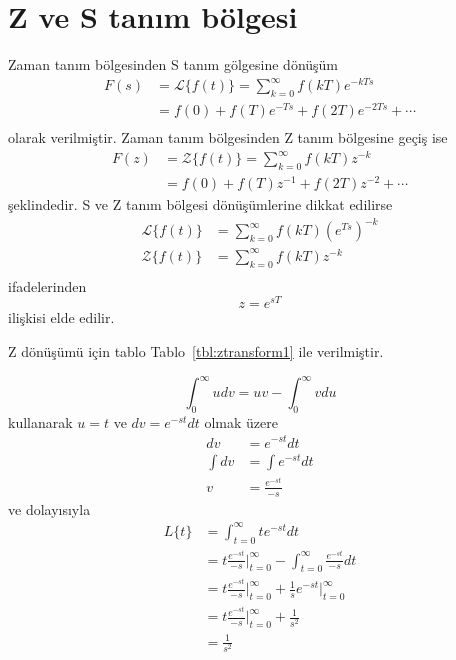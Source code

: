 \chapter{Z ve S tanım bölgesi}
Zaman tanım bölgesinden S tanım gölgesine dönüşüm
\begin{equation}
\begin{split}
    F(s)&=\mathcal{L}\{f(t)\}=\sum_{k=0}^{\infty}f(kT)e^{-kTs}\\
    &=f(0)+f(T)e^{-Ts}+f(2T)e^{-2Ts}+\cdots\\
\end{split}
\end{equation}
olarak verilmiştir. Zaman tanım bölgesinden Z tanım bölgesine geçiş ise
\begin{equation}
    \begin{split}
        F(z)&=\mathcal{Z}\{f(t)\}=\sum_{k=0}^{\infty}f(kT)z^{-k}\\
        &=f(0)+f(T)z^{-1}+f(2T)z^{-2}+\cdots
    \end{split}
\end{equation}
şeklindedir. S ve Z tanım bölgesi dönüşümlerine dikkat edilirse
\begin{equation}
    \begin{split}
        \mathcal{L}\{f(t)\}&=\sum_{k=0}^{\infty}f(kT)(e^{Ts})^{-k}\\
        \mathcal{Z}\{f(t)\}&=\sum_{k=0}^{\infty}f(kT)z^{-k}\\
\end{split}
\end{equation}
ifadelerinden
\begin{equation}
    z=e^{sT}
\end{equation}
ilişkisi elde edilir.

Z dönüşümü için tablo Tablo~\ref{tbl:ztransform1} ile verilmiştir.


\begin{equation}
    \int_{0}^{\infty}udv=uv-\int_{0}^{\infty} vdu
\end{equation}
kullanarak $u=t$ ve $dv=e^{-st}dt$ olmak üzere
\begin{equation}
    \begin{split}
        dv&=e^{-st}dt\\
        \int dv&=\int e^{-st}dt\\
        v&=\frac{e^{-st}}{-s}
    \end{split}
\end{equation}
ve dolayısıyla
\begin{equation}
    \begin{split}
        L\{t\}&=\int_{t=0}^{\infty}t e^{-st}dt\\
        &=t\frac{e^{-st}}{-s}\Bigg|_{t=0}^{\infty}-\int_{t=0}^{\infty}\frac{e^{-st}}{-s}dt\\
        &=t\frac{e^{-st}}{-s}\Bigg|_{t=0}^{\infty}+\frac{1}{s}e^{-st}\Bigg|_{t=0}^{\infty}\\
        &=t\frac{e^{-st}}{-s}\Bigg|_{t=0}^{\infty}+\frac{1}{s^2}\\
        &=\frac{1}{s^2}
    \end{split}
\end{equation}

